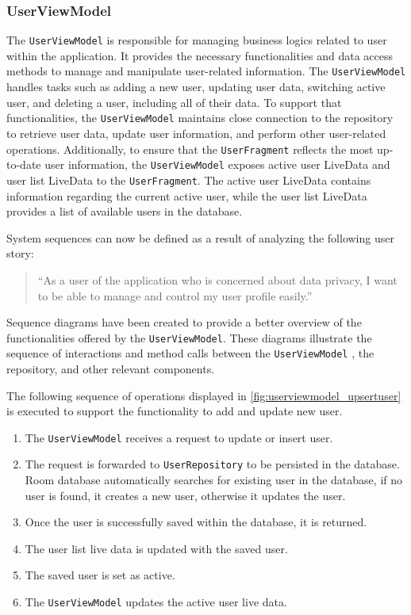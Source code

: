 \subsubsection{UserViewModel}
\label{chap:userviewmodel_design}
The \texttt{UserViewModel} is responsible for managing business logics related to user within the application.
It provides the necessary functionalities and data access methods to manage and manipulate user-related information. 
The \texttt{UserViewModel} handles tasks such as adding a new user, updating user data, switching active user, and deleting a user, including all of their data.
To support that functionalities, the \texttt{UserViewModel} maintains close connection to the repository to retrieve user data, update user information, and perform other user-related operations. 
Additionally, to ensure that the \texttt{UserFragment} reflects the most up-to-date user information, the \texttt{UserViewModel} exposes active user LiveData and user list LiveData to the \texttt{UserFragment}.
The active user LiveData contains information regarding the current active user, while the user list LiveData provides a list of available users in the database.

System sequences can now be defined as a result of analyzing the following user story:
\begin{quotation}
    \enquote{As a user of the application who is concerned about data privacy, I want to be able to manage and control my user profile easily.}
\end{quotation}
Sequence diagrams have been created to provide a better overview of the functionalities offered by the \texttt{UserViewModel}. These diagrams illustrate the sequence of interactions and method calls between the \texttt{UserViewModel} , the repository, and other relevant components.

The following sequence of operations displayed in \autoref{fig:userviewmodel_upsertuser} is executed to support the functionality to add and update new user.
\begin{enumerate}
    \item The \texttt{UserViewModel} receives a request to update or insert user.
    \item The request is forwarded to \texttt{UserRepository} to be persisted in the database. Room database automatically searches for existing user in the database, if no user is found, it creates a new user, otherwise it updates the user.
    \item Once the user is successfully saved within the database, it is returned.
    \item The user list live data is updated with the saved user.
    \item The saved user is set as active.
    \item The \texttt{UserViewModel} updates the active user live data.
\end{enumerate}

